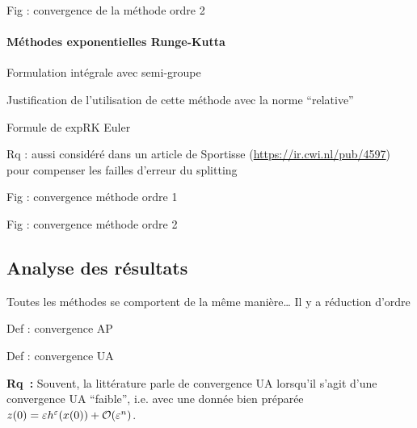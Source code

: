 Fig : convergence de la méthode ordre 2


\paragraph{Méthodes exponentielles Runge-Kutta}

Formulation intégrale avec semi-groupe

Justification de l’utilisation de cette méthode avec la norme “relative”

Formule de expRK Euler

Rq : aussi considéré dans un article de Sportisse (\url{https://ir.cwi.nl/pub/4597}) pour compenser les failles d’erreur du splitting

Fig : convergence méthode ordre 1

Fig : convergence méthode ordre 2


\subsection*{Analyse des résultats}

Toutes les méthodes se comportent de la même manière… Il y a réduction d’ordre

Def : convergence AP

Def : convergence UA

\textbf{Rq~:} Souvent, la littérature parle de convergence UA lorsqu'il s'agit d'une convergence UA \enquote{faible}, i.e. avec une donnée bien préparée $z(0) = \varepsilon h^{\varepsilon}(x(0)) + \mathcal{O}(\varepsilon^n)$. 
